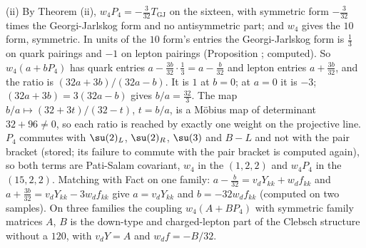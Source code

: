 (ii) By Theorem (ii), $w_{4}P_{4} = -\tfrac{3}{32}T_{\mathrm{GJ}}$ on the sixteen, with symmetric form $-\tfrac{3}{32}$ times the Georgi-Jarlskog form and no antisymmetric part; and $w_{4}$ gives the $10$ form, symmetric. In units of the $10$ form's entries the Georgi-Jarlskog form is $\tfrac13$ on quark pairings and $-1$ on lepton pairings (Proposition ; computed). So $w_{4}(a + bP_{4})$ has quark entries $a - \tfrac{3b}{32}\cdot\tfrac13 = a - \tfrac{b}{32}$ and lepton entries $a + \tfrac{3b}{32}$, and the ratio is $(32a + 3b)/(32a - b)$. It is $1$ at $b = 0$; at $a = 0$ it is $-3$; $(32a + 3b) = 3(32a - b)$ gives $b/a = \tfrac{32}{3}$. The map $b/a \mapsto (32 + 3t)/(32 - t)$, $t = b/a$, is a Möbius map of determinant $32 + 96 \ne 0$, so each ratio is reached by exactly one weight on the projective line. $P_{4}$ commutes with $\su(2)_{L}$, $\su(2)_{R}$, $\su(3)$ and $B - L$ and not with the pair bracket (stored; its failure to commute with the pair bracket is computed again), so both terms are Pati-Salam covariant, $w_{4}$ in the $(1,2,2)$ and $w_{4}P_{4}$ in the $(15,2,2)$. Matching with Fact  on one family: $a - \tfrac{b}{32} = v_{d}Y_{kk} + w_{d}f_{kk}$ and $a + \tfrac{3b}{32} = v_{d}Y_{kk} - 3w_{d}f_{kk}$ give $a = v_{d}Y_{kk}$ and $b = -32w_{d}f_{kk}$ (computed on two samples). On three families the coupling $w_{4}(A + BP_{4})$ with symmetric family matrices $A$, $B$ is the down-type and charged-lepton part of the Clebsch structure without a $120$, with $v_{d}Y = A$ and $w_{d}f = -B/32$.

